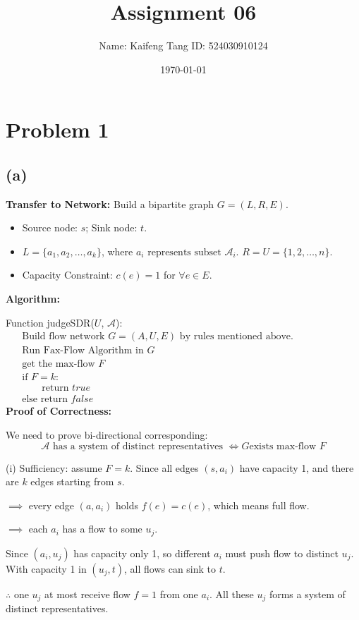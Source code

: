 \documentclass[11pt]{article}
\title{\textbf{Assignment 06}}
\author{Name: Kaifeng Tang \qquad ID: 524030910124}
\date{\today}
\begin{document}
\maketitle 
\section*{Problem 1} 
\subsection*{(a)} 
\textbf{Transfer to Network: }Build a bipartite graph $G = (L, R, E)$. 
\begin{itemize}
    \item Source node: $s$; Sink node: $t$. 
    \item $L = \{a_1, a_2, \dots, a_k\}$, where $a_i \text{ represents subset }\mathcal{A}_i $. $R = U = \{1, 2, \dots, n\}$. 
    \item Capacity Constraint: $c(e) = 1$ for $\forall e \in E$. 
\end{itemize}
\textbf{Algorithm: }

Function judgeSDR($U$, $\mathcal{A}$): 
\begin{align*}
    & \text{Build flow network } G = (A, U, E) \text{ by rules mentioned above}. \qquad \qquad \qquad \\
    & \text{Run Fax-Flow Algorithm in }G \\
    & \text{get the max-flow } F \\
    & \text{if } F = k: \\
    & \qquad \text{return } true \\
    & \text{else return } false  
\end{align*}
\textbf{Proof of Correctness: }

We need to prove bi-directional corresponding: 
\[\mathcal{A} \text{ has a system of distinct representatives } \iff G \text{exists max-flow }F \]

(i) Sufficiency: assume $F = k$. Since all edges $(s, a_i)$ have capacity 1, 
and there are $k$ edges starting from $s$.

$\implies$ every edge $(a, a_i)$ holds $f(e) = c(e)$, which means full flow. 

$\implies$ each $a_i$ has a flow to some $u_j$. 

Since $(a_i, u_j)$ has capacity only 1, so different $a_i$ must push flow to distinct $u_j$. With capacity 1 in $(u_j, t)$, all flows can sink to $t$. 

$\therefore$ one $u_j$ at most receive flow $f = 1$ from one $a_i$. All these $u_j$ forms a system of distinct representatives. 
\end{document}

